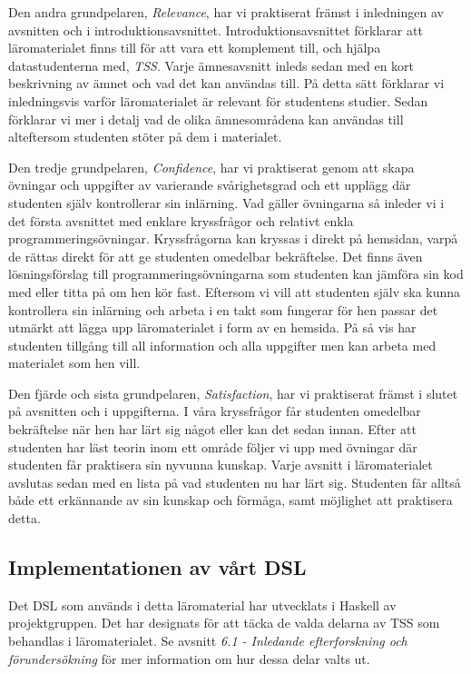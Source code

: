 \documentclass[]{article}
\begin{document}
Den andra grundpelaren, \textit{Relevance}, har vi praktiserat främst
i inledningen av avsnitten och i
introduktionsavsnittet. Introduktionsavsnittet förklarar att
läromaterialet finns till för att vara ett komplement till, och hjälpa
datastudenterna med, \textit{TSS}. Varje ämnesavsnitt inleds sedan med
en kort beskrivning av ämnet och vad det kan användas till. På detta
sätt förklarar vi inledningsvis varför läromaterialet är relevant för
studentens studier. Sedan förklarar vi mer i detalj vad de olika
ämnesområdena kan användas till alteftersom studenten stöter på dem i
materialet.

Den tredje grundpelaren, \textit{Confidence}, har vi praktiserat genom
att skapa övningar och uppgifter av varierande svårighetsgrad och ett
upplägg där studenten själv kontrollerar sin inlärning. Vad gäller
övningarna så inleder vi i det första avsnittet med enklare
kryssfrågor och relativt enkla programmeringsövningar. Kryssfrågorna
kan kryssas i direkt på hemsidan, varpå de rättas direkt för att ge
studenten omedelbar bekräftelse. Det finns även lösningsförslag till
programmeringsövningarna som studenten kan jämföra sin kod med eller
titta på om hen kör fast. Eftersom vi vill att studenten själv ska
kunna kontrollera sin inlärning och arbeta i en takt som fungerar för
hen passar det utmärkt att lägga upp läromaterialet i form av en
hemsida. På så vis har studenten tillgång till all information och
alla uppgifter men kan arbeta med materialet som hen vill.

Den fjärde och sista grundpelaren, \textit{Satisfaction}, har vi
praktiserat främst i slutet på avsnitten och i uppgifterna. I våra
kryssfrågor får studenten omedelbar bekräftelse när hen har lärt sig
något eller kan det sedan innan. Efter att studenten har läst teorin
inom ett område följer vi upp med övningar där studenten får
praktisera sin nyvunna kunskap. Varje avsnitt i läromaterialet
avslutas sedan med en lista på vad studenten nu har lärt
sig. Studenten får alltså både ett erkännande av sin kunskap och
förmåga, samt möjlighet att praktisera detta.

\subsection{Implementationen av vårt DSL}
\label{sec:implDSL}
Det DSL som används i detta läromaterial har utvecklats i Haskell av
projektgruppen. Det har designats för att täcka de valda delarna av
TSS som behandlas i läromaterialet. Se avsnitt
\textit{6.1 - Inledande efterforskning och förundersökning} för mer
information om hur dessa delar valts ut.
\end{document}

